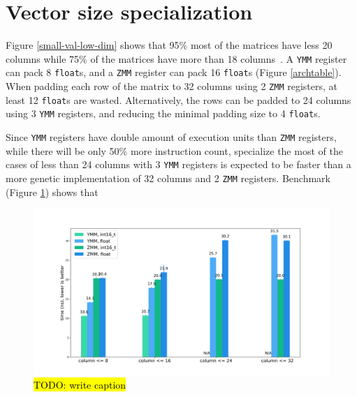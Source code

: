 \documentclass[logo,bsc,singlespacing,parskip]{infthesis}
\newcommand{\dtfloat}{\texttt{float}}
\newcommand{\pivot}{\texttt{pivot}}
\newcommand{\ymm}{\texttt{YMM}}
\newcommand{\zmm}{\texttt{ZMM}}
\begin{document}
\section{Vector size specialization}

Figure \ref{small-val-low-dim} shows that 95\% most of the matrices have less 20
columns while 75\% of the matrices have more than 18 columns~\cite{FPL1}. A
\ymm{} register can pack 8 \dtfloat{}s, and a \zmm{} register can pack 16
\dtfloat{}s (Figure \ref{archtable}). When padding each row of the matrix to 32
columns using 2 \zmm{} registers, at least 12 \dtfloat{}s are wasted.
Alternatively, the rows can be padded to 24 columns using 3 \ymm{} registers,
and reducing the minimal padding size to 4 \dtfloat{}s.

Since \ymm{} registers have double amount of execution units than \zmm{}
registers, while there will be only 50\% more instruction count, specialize the
most of the cases of less than 24 columns with 3 \ymm{} registers is expected to
be faster than a more genetic implementation of 32 columns and 2 \zmm{}
registers. Benchmark (Figure \ref{fig:specialization}) shows that 






\begin{figure}[H]
    \begin{center}
        \includegraphics[width=\linewidth]{image/specialize-i16-f32.png}
    \end{center}
    \caption{\hl{TODO: write caption}}
    \label{fig:specialization}
\end{figure}
\end{document}
